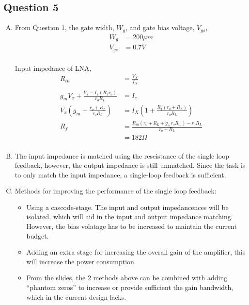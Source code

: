 \documentclass{article}
\begin{document}
\subsection{Question 5}
\label{sec:org9338ea6}
\begin{enumerate}[A.]
\item From Question 1, the gate width, \(W_{g}\), and gate bias voltage, \(V_{gs}\),
\begin{equation*}
\begin{aligned}
W_{g} &= 200 \mu{}m \\
V_{gs} &= 0.7 V \\
\end{aligned}
\end{equation*}

Input impedance of LNA,
\begin{equation*}
\begin{aligned}
R_{in} &= \frac{V_{X}}{I_{X}} \\
\\
g_{m}V_{x} + \frac{V_{x} - I_{x}(R_{f}r_{o})}{r_{o}R_{L}} &= I_{x} \\
V_{x}(g_{m} + \frac{r_{o} + R_{L}}{r_{o}R_{L}}) &= I_{X}(1 + \frac{R_{f}(r_{o} + R_{L})}{r_{o}R_{L}}) \\
R_{f} &= \frac{R_{in}(r_{o} + R_{L} + g_{m}r_{o}R_{m}) - r_{o}R_{L}}{r_{o} + R_{L}} \\
&= 182 \Omega \\
\end{aligned}
\end{equation*}

\item The input impedance is matched using the reseistance of the single loop feedback,
however, the output impedance is still unmatched. Since the task is to only match the input impedance,
a single-loop feedback is sufficient.

\item Methods for improving the performance of the single loop feedback:
\begin{itemize}
\item Using a cascode-stage. The input and output impedancences will be isolated,
which will aid in the input and output impedance matching. However, the bias volatage has to be
increased to maintain the current budget.

\item Adding an extra stage for increasing the overall gain of the amplifier, this will increase the power
consumption.

\item From the slides, the 2 methods above can be combined with adding ``phantom zeros'' to increase or provide sufficient
the gain bandwidth, which in the current design lacks.
\end{itemize}
\end{enumerate}
\end{document}
